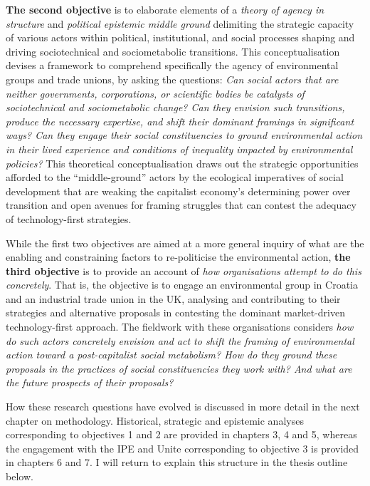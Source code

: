 \documentclass[a4paper, nobind]{templates/ociamthesis}
\begin{document}
\textbf{The second objective} is to elaborate elements of a \emph{theory of agency in structure} and \emph{political epistemic middle ground} delimiting the strategic capacity of various actors within political, institutional, and social processes shaping and driving sociotechnical and sociometabolic transitions. This conceptualisation devises a framework to comprehend specifically the agency of environmental groups and trade unions, by asking the questions: \emph{Can social actors that are neither governments, corporations, or scientific bodies be catalysts of sociotechnical and sociometabolic change? Can they envision such transitions, produce the necessary expertise, and shift their dominant framings in significant ways? Can they engage their social constituencies to ground environmental action in their lived experience and conditions of inequality impacted by environmental policies?} This theoretical conceptualisation draws out the strategic opportunities afforded to the ``middle-ground'' actors by the ecological imperatives of social development that are weaking the capitalist economy's determining power over transition and open avenues for framing struggles that can contest the adequacy of technology-first strategies.

While the first two objectives are aimed at a more general inquiry of what are the enabling and constraining factors to re-politicise the environmental action, \textbf{the third objective} is to provide an account of \emph{how organisations attempt to do this concretely}. That is, the objective is to engage an environmental group in Croatia and an industrial trade union in the UK, analysing and contributing to their strategies and alternative proposals in contesting the dominant market-driven technology-first approach. The fieldwork with these organisations considers \emph{how do such actors concretely envision and act to shift the framing of environmental action toward a post-capitalist social metabolism? How do they ground these proposals in the practices of social constituencies they work with? And what are the future prospects of their proposals?}

How these research questions have evolved is discussed in more detail in the next chapter on methodology. Historical, strategic and epistemic analyses corresponding to objectives 1 and 2 are provided in chapters 3, 4 and 5, whereas the engagement with the IPE and Unite corresponding to objective 3 is provided in chapters 6 and 7. I will return to explain this structure in the thesis outline below.
\end{document}
